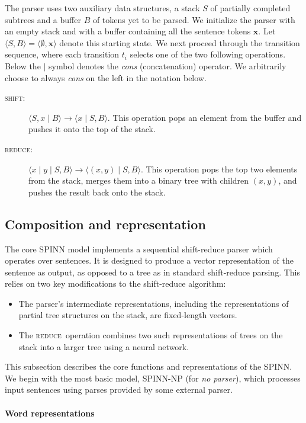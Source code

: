 \documentclass[11pt]{article}
\newcommand{\shift}{\textsc{shift}}
\newcommand{\reduce}{\textsc{reduce}}
\begin{document}
The parser uses two auxiliary data structures, a stack $S$ of partially completed subtrees and a buffer $B$ of tokens yet to be parsed. We initialize the parser with an empty stack and with a buffer containing all the sentence tokens $\mathbf x$. Let $\langle S, B \rangle = \langle \emptyset, \mathbf x \rangle$ denote this starting state. We next proceed through the transition sequence, where each transition $t_i$ selects one of the two following operations. Below the $\mid$ symbol denotes the \textit{cons} (concatenation) operator. We arbitrarily choose to always \textit{cons} on the left in the notation below.
\begin{description}
  \item[\shift:] $\langle S, x \mid B \rangle \to \langle x \mid S, B \rangle$. This operation pops an element from the buffer and pushes it onto the top of the stack.
  \item[\reduce:] $\langle x \mid y \mid S, B \rangle \to \langle (x, y) \mid S, B \rangle$. This operation pops the top two elements from the stack, merges them into a binary tree with children $(x, y)$, and pushes the result back onto the stack.
\end{description}

\subsection{Composition and representation}

The core SPINN model implements a sequential shift-reduce parser which operates over sentences. It is designed to produce a vector representation of the sentence as output, as opposed to a tree as in standard shift-reduce parsing. This relies on two key modifications to the shift-reduce algorithm:
\begin{itemize}
\item The parser's intermediate representations, including the representations of partial tree structures on the stack, are fixed-length vectors.
\item The \reduce~operation combines two such representations of trees on the stack into a larger tree using a neural network.
\end{itemize}

This subsection describes the core functions and representations of the SPINN. We begin with the most basic model, SPINN-NP (for \textit{no parser}), which processes input sentences using parses provided by some external parser.

\paragraph{Word representations}
\end{document}
